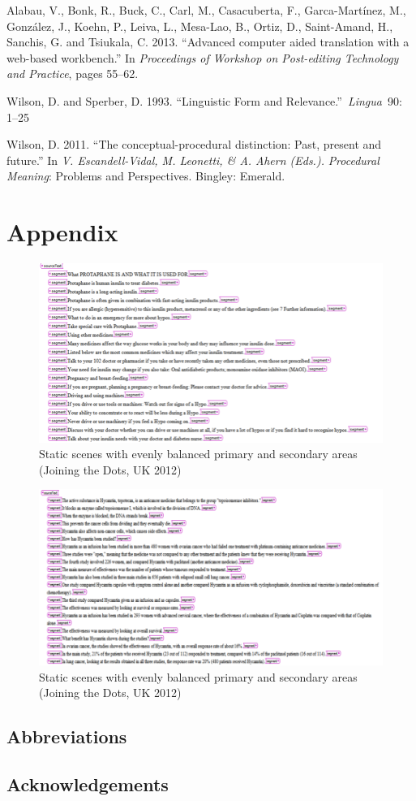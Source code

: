 \documentclass[output=paper]{langsci/langscibook}
\begin{document}
Alabau, V., Bonk, R., Buck, C., Carl, M., Casacuberta, F., Garca-Martínez, M., González, J., Koehn, P., Leiva, L., Mesa-Lao, B., Ortiz, D., Saint-Amand, H., Sanchis, G. and Tsiukala, C. 2013. “Advanced computer aided translation with a web-based workbench.” In \textit{Proceedings of Workshop on Post-editing Technology and Practice}, pages 55–62.



Wilson, D. and Sperber, D. 1993. “Linguistic Form and Relevance.”{~}\textit{Lingua}{~}90: 1–25



Wilson, D. 2011. “The conceptual-procedural distinction: Past, present and future.” In \textit{V. Escandell-Vidal, M. Leonetti, \& A. Ahern (Eds.).} \textit{Procedural Meaning}: Problems and Perspectives. Bingley: Emerald. 


\section{Appendix}

  
\begin{figure}
 \includegraphics[width=\textwidth]{figures/Sarto8.png}
 \caption{Static scenes with evenly balanced primary and secondary areas (Joining the Dots, UK 2012)}
 \label{fig:}
\end{figure} 

\begin{figure}
 \includegraphics[width=\textwidth]{figures/Sarto9.png}
 \caption{Static scenes with evenly balanced primary and secondary areas (Joining the Dots, UK 2012)}
 \label{fig:}
\end{figure} 
 



\subsection*{Abbreviations}
\subsection*{Acknowledgements}

\printbibliography[heading=subbibliography,notkeyword=this]
\end{document}
